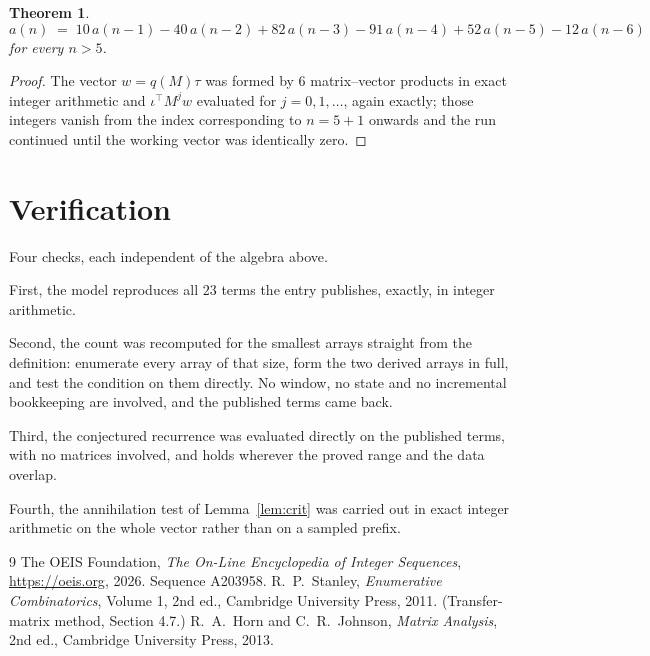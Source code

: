\documentclass[11pt,a4paper]{article}
\theoremstyle{plain}
\newtheorem{theorem}{Theorem}
\theoremstyle{definition}
\begin{document}
\begin{theorem}
\[
a(n)\;=\;10\,a(n-1) - 40\,a(n-2) + 82\,a(n-3) - 91\,a(n-4) + 52\,a(n-5) - 12\,a(n-6)
\]
for every $n>5$.
\end{theorem}

\begin{proof}
The vector $w=q(M)\tau$ was formed by $6$ matrix--vector products in exact integer
arithmetic and $\iota^{\!\top}M^{j}w$ evaluated for $j=0,1,\dots$, again exactly; those
integers vanish from the index corresponding to $n=5+1$ onwards and the run continued
until the working vector was identically zero.
\end{proof}

\section{Verification}

Four checks, each independent of the algebra above.

First, the model reproduces all $23$ terms the entry publishes, exactly, in integer
arithmetic.

Second, the count was recomputed for the smallest arrays straight from the definition:
enumerate every array of that size, form the two derived arrays in full, and test the condition
on them directly. No window, no state and no incremental bookkeeping are involved, and the
published terms came back.

Third, the conjectured recurrence was evaluated directly on the published terms, with no
matrices involved, and holds wherever the proved range and the data overlap.

Fourth, the annihilation test of Lemma~\ref{lem:crit} was carried out in exact integer
arithmetic on the whole vector rather than on a sampled prefix.

\begin{thebibliography}{9}
 The OEIS Foundation, \emph{The On-Line Encyclopedia of Integer
Sequences}, \url{https://oeis.org}, 2026. Sequence A203958.
 R.~P.~Stanley, \emph{Enumerative Combinatorics}, Volume 1, 2nd ed.,
Cambridge University Press, 2011. (Transfer-matrix method, Section 4.7.)
 R.~A.~Horn and C.~R.~Johnson, \emph{Matrix Analysis}, 2nd ed., Cambridge
University Press, 2013.
\end{thebibliography}
\end{document}
